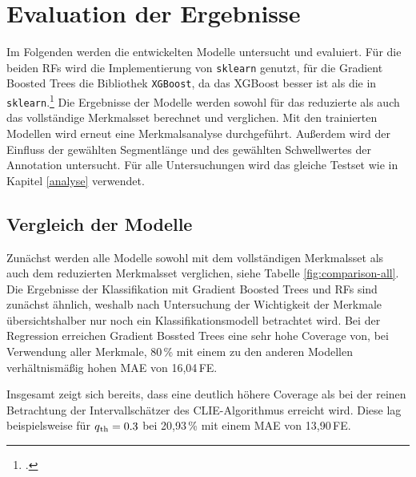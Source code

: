 \chapter{Evaluation der Ergebnisse}\label{evaluation}

Im Folgenden werden die entwickelten Modelle untersucht und evaluiert. Für die beiden \acl{RF}s wird die Implementierung von \texttt{sklearn} genutzt, für die Gradient Boosted Trees die Bibliothek \texttt{XGBoost}, da das \ac{XGBoost} besser ist als die in \texttt{sklearn}.\footcite[Kapitel 10]{Harrison2019} Die Ergebnisse der Modelle werden sowohl für das reduzierte als auch das vollständige Merkmalsset berechnet und verglichen. Mit den trainierten Modellen wird erneut eine Merkmalsanalyse durchgeführt. Außerdem wird der Einfluss der gewählten Segmentlänge und des gewählten Schwellwertes der Annotation untersucht. Für alle Untersuchungen wird das gleiche Testset wie in Kapitel \ref{analyse} verwendet.

\section{Vergleich der Modelle} %

Zunächst werden alle Modelle sowohl mit dem vollständigen Merkmalsset als auch dem reduzierten Merkmalsset verglichen, siehe Tabelle \ref{fig:comparison-all}. Die Ergebnisse der Klassifikation mit Gradient Boosted Trees und \acl{RF}s sind zunächst ähnlich, weshalb nach Untersuchung der Wichtigkeit der Merkmale übersichtshalber nur noch ein Klassifikationsmodell betrachtet wird. Bei der Regression erreichen Gradient Bossted Trees eine sehr hohe Coverage von, bei Verwendung aller Merkmale, 80\,\% mit einem zu den anderen Modellen verhältnismäßig hohen \ac{MAE} von 16,04\,\si{FE}. 

Insgesamt zeigt sich bereits, dass eine deutlich höhere Coverage als bei der reinen Betrachtung der Intervallschätzer des CLIE-Algorithmus erreicht wird. Diese lag beispielsweise für $q\textsubscript{th} = 0.3$ bei 20,93\,\% mit einem \ac{MAE} von 13,90\,\si{FE}.
	

